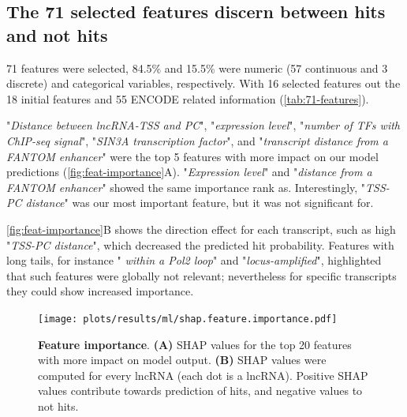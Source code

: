 \clearpage

\subsection{The 71 selected features discern between hits and not hits}
\label{sec:model-exp}

71 features were selected, 84.5\% and 15.5\% were numeric (57 continuous and 3 discrete) and categorical variables, respectively. With 16 selected features out the 18 initial features\autocite{liu_2017_crispri}  and 55 ENCODE related information  (\autoref{tab:71-features}).

"\textit{Distance between lncRNA-TSS and PC}", "\textit{expression level}", "\textit{number of TFs with ChIP-seq signal}", "\textit{SIN3A transcription factor}", and "\textit{transcript distance from a FANTOM enhancer}" were the top 5 features with more impact on our model predictions (\autoref{fig:feat-importance}A).  "\textit{Expression level}" and "\textit{distance from a FANTOM enhancer}" showed the same importance rank as.\autocite{liu_2017_crispri} Interestingly, "\textit{TSS-PC distance}" was our most important feature, but it was not significant for.\autocite{liu_2017_crispri}

\autoref{fig:feat-importance}B shows the direction effect for each transcript, such as high "\textit{TSS-PC distance}", which decreased the predicted hit probability. Features with long tails, for instance "\textit{ within a Pol2 loop}" and "\textit{locus-amplified}", highlighted that such features were globally not relevant; nevertheless for specific transcripts they could show increased importance.

\begin{figure}[ht!]
  \centering
  \texttt{[image: plots/results/ml/shap.feature.importance.pdf]}
  \caption[Feature importance]{\textbf{Feature importance}. \textbf{(A)} SHAP values for the top 20 features with more impact on model output. \textbf{(B)} SHAP values were computed for every lncRNA (each dot is a lncRNA). Positive SHAP values contribute towards prediction of hits, and negative values to not hits.}
  \label{fig:feat-importance}
\end{figure}

